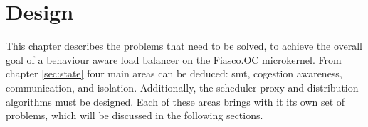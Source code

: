 \chapter{Design}
\label{sec:design}




This chapter describes the problems that need to be solved, to achieve the
overall goal of a behaviour aware load balancer on the Fiasco.OC microkernel.
From chapter \ref{sec:state} four main areas can be deduced: \gls{smt},
cogestion awareness, communication, and isolation.
Additionally, the scheduler proxy and distribution algorithms must be designed.
Each of these areas brings with it its own set of problems, which will be
discussed in the following sections.









